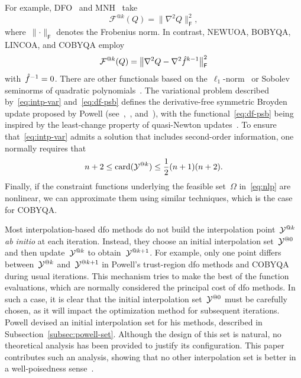 \documentclass{article}
\makeatletter
\newcounter{cite}
\theoremstyle{definition}
\theoremstyle{plain}
\theoremstyle{remark}
\DeclareMathOperator{\card}{card}
\newcommand*{\norm}[2][]{#1\lVert#2#1\rVert}
\newcommand*{\obj}{f}
\newcommand*{\objm}[1][]{\hat{\obj}\ifblank{#1}{}{^{#1}}}
\newcommand*{\fset}{\Omega}
\newcommand*{\xpt}[1][]{\mathcal{Y}\ifblank{#1}{}{^{@#1}}}
\makeatother
\begin{document}
For example, DFO~\cite{Conn_Scheinberg_Toint_1998} and MNH~\cite{Wild_2008} take
\begin{equation}
    \label{eq:mnh}
    \mathcal{F}^{@k}(Q) = \norm[\big]{\nabla^2 Q}_{\mathsf{F}}^2,
\end{equation}
where~$\norm{\cdot}_{\mathsf{F}}$ denotes the Frobenius norm.
In contrast, NEWUOA, BOBYQA, LINCOA, and COBYQA employ
\begin{equation}
    \label{eq:df-psb}
    \mathcal{F}^{@k}(Q) = \norm[\big]{\nabla^2 Q - \nabla^2 \objm[k - 1]}_{\mathsf{F}}^2
\end{equation}
with~$\objm[-1] = 0$.
There are other functionals based on the~$\ell_1$-norm~\cite{Bandeira_Scheinberg_Vicente_2012} or Sobolev seminorms of quadratic polynomials~\cite{Zhang_2014,Xie_Yuan_2022}.
The variational problem described by~\eqref{eq:intp-var} and~\eqref{eq:df-psb} defines the derivative-free symmetric
Broyden update proposed by Powell (see~\cite{Powell_2004a,Powell_2013},~\cite[\S~3.6]{Zhang_2012}, and~\cite[\S~2.4.2]{Ragonneau_2022}), with the functional~\eqref{eq:df-psb} being inspired by the least-change property of quasi-Newton updates~\cite{Dennis_Schnabel_1979}.
To ensure that~\eqref{eq:intp-var} admits a solution that includes second-order information, one normally requires that
\begin{equation*}
    n + 2 \le \card(\xpt[k]) \le \frac{1}{2} (n + 1) (n + 2).
\end{equation*}
Finally, if the constraint functions underlying the feasible set~$\fset$ in~\eqref{eq:nlp} are nonlinear, we can approximate them using similar techniques, which is the case for COBYQA.

Most interpolation-based \gls{dfo} methods do not build the interpolation point~$\xpt[k]$ \emph{ab initio} at each iteration.
Instead, they choose an initial interpolation set~$\xpt[0]$ and then  update~$\xpt[k]$ to obtain~$\xpt[k + 1]$.
For example, only one point differs between~$\xpt[k]$ and~$\xpt[k + 1]$ in Powell's trust-region \gls{dfo} methods and COBYQA during usual iterations.
This mechanism tries to make the best of the function evaluations, which are normally considered the principal cost of \gls{dfo} methods.
In such a case, it is clear that the initial interpolation set~$\xpt[0]$ must be carefully chosen, as it will impact the optimization method for subsequent iterations.
Powell devised an initial interpolation set for his methods, described in Subsection~\ref{subsec:powell-set}.
Although the design of this set is natural, no theoretical analysis has been provided to justify its configuration.
This paper contributes such an analysis, showing that no other interpolation set is better in a well-poisedness sense~\cite[\S~3.3]{Conn_Scheinberg_Vicente_2009}.
\end{document}
